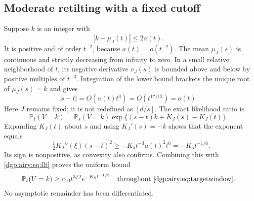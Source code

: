 \documentclass[11pt,letterpaper]{article}
\numberwithin{equation}{section}
\theoremstyle{remark}\newtheorem{remark}[theorem]{Remark}
\newcommand{\PP}{\mathbb P}
\newcommand{\floor}[1]{\left\lfloor #1\right\rfloor}
\begin{document}
\subsection{Moderate retilting with a fixed cutoff}
Suppose $k$ is an integer with
\begin{equation}\label{dgp:airy:eq:targetwindow}
 |k-\mu_J(t)|\leq2a(t).
\end{equation}
It is positive and of order $t^{-2}$, because $a(t)=o(t^{-2})$.
The mean $\mu_J(s)$ is continuous and strictly decreasing from infinity
to zero. In a small relative neighborhood of $t$, its negative
derivative $v_J(s)$ is bounded above and below by positive multiples
of $t^{-3}$. Integration of the lower bound brackets the unique root
of $\mu_J(s)=k$ and gives
\begin{equation}\label{dgp:airy:eq:tiltscale}
 |s-t|=O(a(t)t^3)=O(t^{17/12})=o(t).
\end{equation}
Here $J$ remains fixed; it is not redefined as $\floor{d/s}$.
The exact likelihood ratio is
\begin{equation}\label{dgp:airy:eq:likelihood}
 \PP_t(V=k)=\PP_s(V=k)
   \exp\{(s-t)k+K_J(s)-K_J(t)\}.
\end{equation}
Expanding $K_J(t)$ about $s$ and using $K_J'(s)=-k$ shows that the
exponent equals
\[
 -\tfrac12K_J''(\xi)(s-t)^2
 \geq-K_5 t^{-3}a(t)^2t^6=-K_5t^{-1/6}.
\]
Its sign is nonpositive, as convexity also confirms.
Combining this with \eqref{dgp:airy:eq:llt} proves the uniform bound
\begin{equation}\label{dgp:airy:eq:localmass}
 \PP_t(V=k)\geq c_{10}t^{3/2}e^{-K_5t^{-1/6}}
 \quad\hbox{throughout \eqref{dgp:airy:eq:targetwindow}}.
\end{equation}
No asymptotic remainder has been differentiated.
\end{document}
